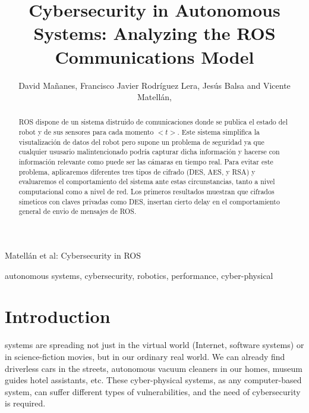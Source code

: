 \documentclass[journal,twoside]{JoPhA}
\begin{document}
\title{Cybersecurity in Autonomous Systems: Analyzing the ROS Communications Model}

\author{David Ma\~nanes, Francisco Javier Rodr\'iguez Lera, Jes\'us Balsa and Vicente Matell\'an,
}


%
{Matell\'an et al: Cybersecurity in ROS}
\maketitle


\begin{abstract}
ROS dispone de un sistema distruido de comunicaciones donde se publica el estado del robot y de sus sensores para cada momento $<t>$.
Este sistema simplifica la visutalización de datos del robot pero  supone un problema de seguridad ya que cualquier ususario malintencionado podría capturar dicha información y hacerse
con información relevante como puede ser las cámaras en tiempo real.
Para evitar este problema, aplicaremos diferentes tres tipos de cifrado (DES, AES, y RSA) y evaluaremos el comportamiento del sistema ante estas circunstancias, tanto a nivel computacional como a nivel de red.
Los primeros resultados muestran que cifrados simeticos con claves privadas como DES, insertan cierto delay en el comportamiento general de envio de mensajes de ROS.
\end{abstract}


\begin{IEEEkeywords}
autonomous systems, cybersecurity, robotics, performance, cyber-physical
\end{IEEEkeywords}


\section{Introduction}

 systems are spreading not just in the virtual world (Internet, software systems) or in science-fiction movies, but in our ordinary real world. We can already find driverless cars in the streets, autonomous vacuum cleaners in our homes, museum guides hotel assistants, etc. These cyber-physical systems, as any computer-based system, can suffer different types of vulnerabilities, and the  need of cybersecurity \cite{Morante2015} is required. 
\end{document}
